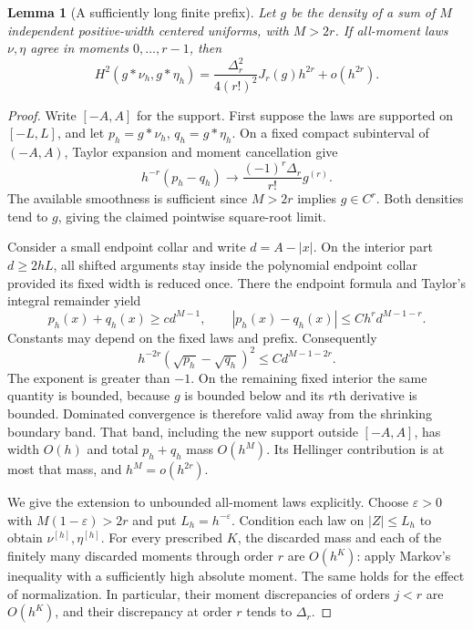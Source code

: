 \documentclass[11pt,a4paper]{article}
\numberwithin{equation}{section}
\newtheorem{lemma}[theorem]{Lemma}
\theoremstyle{definition}
\theoremstyle{remark}
\begin{document}
\begin{lemma}[A sufficiently long finite prefix]
\label{lem:finite-H}
Let $g$ be the density of a sum of $M$ independent positive-width centered
uniforms, with $M>2r$. If all-moment laws $\nu,\eta$ agree in moments
$0,\ldots,r-1$, then
\begin{equation}
 H^2(g*\nu_h,g*\eta_h)
 =\frac{\Delta_r^2}{4(r!)^2}J_r(g)h^{2r}+o(h^{2r}).
 \label{eq:finite-H}
\end{equation}
\end{lemma}
\begin{proof}
Write $[-A,A]$ for the support. First suppose the laws are supported on
$[-L,L]$, and let $p_h=g*\nu_h$, $q_h=g*\eta_h$.
On a fixed compact subinterval of $(-A,A)$, Taylor expansion and moment
cancellation give
\begin{equation}
 h^{-r}(p_h-q_h)\longrightarrow
 \frac{(-1)^r\Delta_r}{r!}g^{(r)}.
 \label{eq:pointwise-finite}
\end{equation}
The available smoothness is sufficient since $M>2r$ implies $g\in C^r$.
Both densities tend to $g$, giving the claimed pointwise square-root limit.

Consider a small endpoint collar and write $d=A-|x|$. On the interior part
$d\ge2hL$, all shifted arguments stay inside the polynomial endpoint collar
provided its fixed width is reduced once. There the endpoint formula and
Taylor's integral remainder yield
\begin{equation}
 p_h(x)+q_h(x)\ge c d^{M-1},\qquad
 |p_h(x)-q_h(x)|\le C h^r d^{M-1-r}.
 \label{eq:collar-bound}
\end{equation}
Constants may depend on the fixed laws and prefix. Consequently
\begin{equation}
 h^{-2r}(\sqrt{p_h}-\sqrt{q_h})^2
 \le C d^{M-1-2r}.
 \label{eq:collar-domination}
\end{equation}
The exponent is greater than $-1$. On the remaining fixed interior the same
quantity is bounded, because $g$ is bounded below and its $r$th derivative
is bounded. Dominated convergence is therefore valid away from the shrinking
boundary band. That band, including the new support outside $[-A,A]$, has
width $O(h)$ and total $p_h+q_h$ mass $O(h^M)$. Its Hellinger contribution
is at most that mass, and $h^M=o(h^{2r})$.

We give the extension to unbounded all-moment laws explicitly. Choose
$\varepsilon>0$ with $M(1-\varepsilon)>2r$ and put $L_h=h^{-\varepsilon}$.
Condition each law on $|Z|\le L_h$ to obtain $\nu^{[h]},\eta^{[h]}$.
For every prescribed $K$, the discarded mass and each of the finitely many
discarded moments through order $r$ are $O(h^K)$: apply Markov's inequality
with a sufficiently high absolute moment. The same holds for the effect of
normalization. In particular, their moment discrepancies of orders $j<r$
are $O(h^K)$, and their discrepancy at order $r$ tends to $\Delta_r$.


\end{proof}
\end{document}

